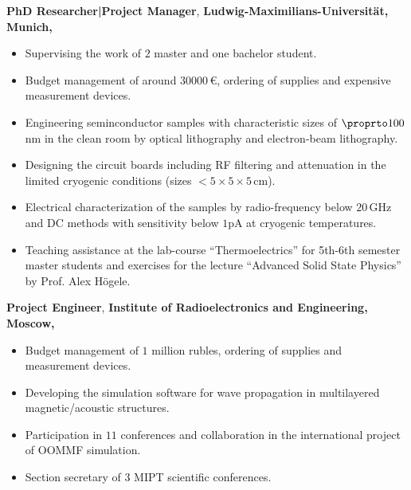 \documentclass[a4paper,10pt]{article}
\begin{document}
\begin{flushleft}\textbf{PhD Researcher|Project Manager}, \textbf{Ludwig-Maximilians-Universit{\"a}t, Munich, {}}\end{flushleft}
\begin{itemize}
\item Supervising the work of $2$ master and one bachelor student.
\item Budget management of around $30000\,$€, ordering of supplies and expensive measurement devices.
\item Engineering seminconductor samples with characteristic sizes of $\proprto 100\,$nm in the clean room 
by optical lithography and electron-beam lithography.
\item Designing the circuit boards including RF filtering and attenuation in the limited cryogenic conditions (sizes $<5\times5\times5\,$cm).
\item Electrical characterization of the samples by radio-frequency below $20\,$GHz and DC methods with sensitivity below $1$pA at cryogenic temperatures.
\item Teaching assistance at the lab-course “Thermoelectrics” for 5th-6th semester master students and exercises for the lecture “Advanced Solid State Physics” by Prof. Alex H\"ogele.
\end{itemize}

\begin{flushleft}{\textbf{Project Engineer}, \textbf{Institute of Radioelectronics and Engineering, Moscow, }}
\end{flushleft}
\begin{itemize}
\item Budget management of $1$ million rubles, ordering of supplies and measurement devices.
\item Developing the simulation software for wave propagation in multilayered magnetic/acoustic structures.
\item Participation in $11$ conferences and collaboration in the international project of OOMMF simulation.
\item Section secretary of $3$ MIPT scientific conferences.
\end{itemize}
\end{document}
